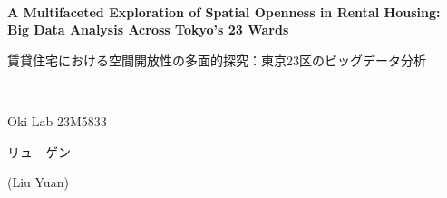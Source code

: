 \documentclass[11pt,a4paper]{article}
\begin{document}
\begin{center}
~\\
{\fontsize{12}{14}\selectfont \textbf{A Multifaceted Exploration of Spatial Openness in Rental Housing: Big Data Analysis Across Tokyo's 23 Wards}}\\
\begin{CJK}{UTF8}{min}
{\fontsize{11}{11}\selectfont 賃貸住宅における空間開放性の多面的探究：東京23区のビッグデータ分析}
\end{CJK}\\
\end{center}
\begin{flushright}
{\fontsize{11}{13}\selectfont Oki Lab  23M5833 \begin{CJK}{UTF8}{min}リュ　ゲン\end{CJK} (Liu Yuan)}
\end{flushright}
\end{document}
